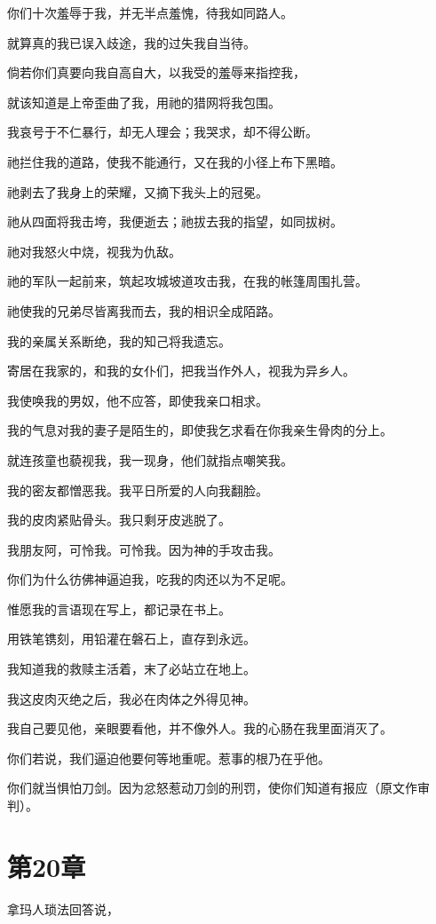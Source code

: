 \documentclass[12pt,oneside]{book}
\begin{document}
你们十次羞辱于我，并无半点羞愧，待我如同路人。

就算真的我已误入歧途，我的过失我自当待。

倘若你们真要向我自高自大，以我受的羞辱来指控我，

就该知道是上帝歪曲了我，用祂的猎网将我包围。

我哀号于不仁暴行，却无人理会；我哭求，却不得公断。

祂拦住我的道路，使我不能通行，又在我的小径上布下黑暗。

祂剥去了我身上的荣耀，又摘下我头上的冠冕。

祂从四面将我击垮，我便逝去；祂拔去我的指望，如同拔树。

祂对我怒火中烧，视我为仇敌。

祂的军队一起前来，筑起攻城坡道攻击我，在我的帐篷周围扎营。

祂使我的兄弟尽皆离我而去，我的相识全成陌路。

我的亲属关系断绝，我的知己将我遗忘。

寄居在我家的，和我的女仆们，把我当作外人，视我为异乡人。

我使唤我的男奴，他不应答，即使我亲口相求。

我的气息对我的妻子是陌生的，即使我乞求看在你我亲生骨肉的分上。

就连孩童也藐视我，我一现身，他们就指点嘲笑我。


我的密友都憎恶我。我平日所爱的人向我翻脸。

我的皮肉紧贴骨头。我只剩牙皮逃脱了。

我朋友阿，可怜我。可怜我。因为神的手攻击我。

你们为什么彷佛神逼迫我，吃我的肉还以为不足呢。

惟愿我的言语现在写上，都记录在书上。

用铁笔镌刻，用铅灌在磐石上，直存到永远。

我知道我的救赎主活着，末了必站立在地上。

我这皮肉灭绝之后，我必在肉体之外得见神。

我自己要见他，亲眼要看他，并不像外人。我的心肠在我里面消灭了。

你们若说，我们逼迫他要何等地重呢。惹事的根乃在乎他。

你们就当惧怕刀剑。因为忿怒惹动刀剑的刑罚，使你们知道有报应（原文作审判）。


\chapter{第20章}
拿玛人琐法回答说，
\end{document}
